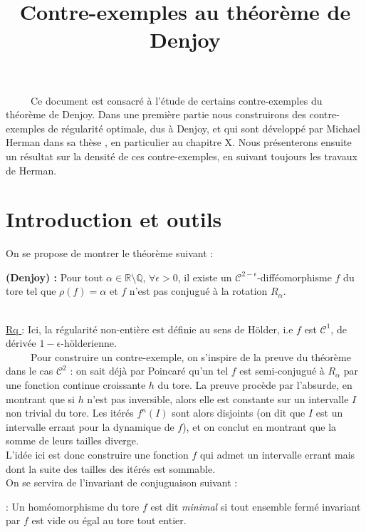 \documentclass[11pt,a4paper]{article}
\title{\textbf{Contre-exemples au théorème de Denjoy }}
\date{}
\begin{document}
\maketitle

\ \ \ \ \ Ce document est consacré à l'étude de certains contre-exemples du théorème de Denjoy. Dans une première partie nous construirons des contre-exemples de régularité optimale, dus à Denjoy, et qui sont développé par Michael Herman dans sa thèse \cite{herman}, en particulier au chapitre X. Nous présenterons ensuite un résultat sur la densité de ces contre-exemples, en suivant toujours les travaux de Herman.
\section{Introduction et outils}

On se propose de montrer le théorème suivant :

\begin{theorem}\textbf{(Denjoy) : }
Pour tout $\alpha \in \mathbb{R} \setminus \mathbb{Q}$, $\forall \epsilon > 0$, il existe un $\mathcal{C}^{2-\epsilon}$-difféomorphisme $f$ du tore tel que $\rho(f)=\alpha$ et $f$ n'est pas conjugué à la rotation $R_\alpha$.
\end{theorem}

~\\
\underline{Rq }: Ici, la  régularité non-entière est définie au sens de Hölder, i.e $f$ est $\mathcal{C}^1$, de dérivée $1-\epsilon$-hölderienne.\\

\ \ \ \ \ Pour construire un contre-exemple, on s'inspire de la preuve du théorème dans le cas $\mathcal{C}^2$ : on sait déjà par Poincaré qu'un tel $f$ est semi-conjugué à $R_\alpha$ par une fonction continue croissante $h$ du tore. La preuve procède par l'absurde, en montrant que si $h$ n'est pas inversible, alors elle est constante sur un intervalle $I$ non trivial du tore. Les itérés $f^n(I)$ sont alors disjoints (on dit que $I$ est un intervalle errant pour la dynamique de $f$), et on conclut en montrant que la somme de leurs tailles diverge. \\ 
L'idée ici est donc construire une fonction $f$ qui admet un intervalle errant mais dont la suite des tailles des itérés est sommable. \\

On se servira de l'invariant de conjuguaison suivant : 

\begin{defin} : Un homéomorphisme du tore $f$ est dit \textit{minimal} si tout ensemble fermé invariant par  $f$ est vide ou égal au tore tout entier. 
\end{defin}
\end{document}
